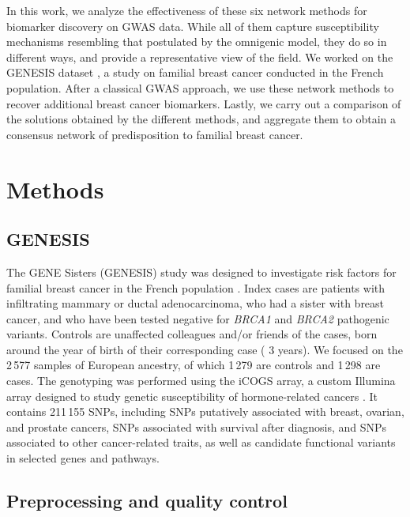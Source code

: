 \documentclass[twocolumn, 11pt]{article}
\begin{document}
In this work, we analyze the effectiveness of these six network methods for biomarker discovery on GWAS data. While all of them capture susceptibility mechanisms resembling that postulated by the omnigenic model, they do so in different ways, and provide a representative view of the field. We worked on the GENESIS dataset \cite{sinilnikova_genesis:_2016}, a study on familial breast cancer conducted in the French population. After a classical GWAS approach, we use these network methods to recover additional breast cancer biomarkers. Lastly, we carry out a comparison of the solutions obtained by the different methods, and aggregate them to obtain a consensus network of predisposition to familial breast cancer. 

\section{Methods}
\subsection{GENESIS}

The GENE Sisters (GENESIS) study was designed to investigate risk factors for familial breast cancer in the French population \cite{sinilnikova_genesis:_2016}. Index cases are patients with infiltrating mammary or ductal adenocarcinoma, who had a sister with breast cancer, and who have been tested negative for \emph{BRCA1} and \emph{BRCA2} pathogenic variants. Controls are unaffected colleagues and/or friends of the cases, born around the year of birth of their corresponding case (\textpm{} 3 years). We focused on the 2\,577 samples of European ancestry, of which 1\,279 are controls and 1\,298 are cases. The genotyping was performed using the iCOGS array, a custom Illumina array designed to study genetic susceptibility of hormone-related cancers \cite{sakoda_turning_2013}. It contains 211\,155 SNPs, including SNPs putatively associated with breast, ovarian, and prostate cancers, SNPs associated with survival after diagnosis, and SNPs associated to other cancer-related traits, as well as candidate functional variants in selected genes and pathways.

\subsection{Preprocessing and quality control}
\end{document}
